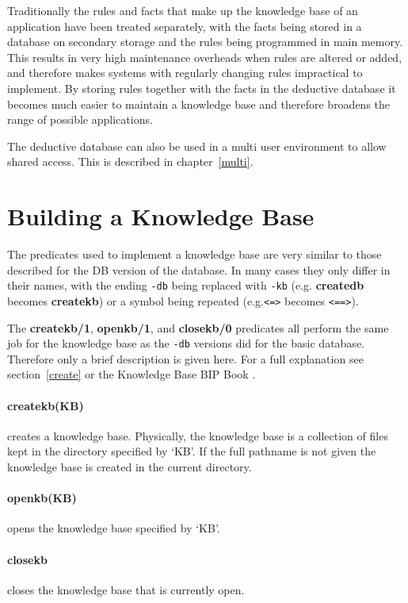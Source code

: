 Traditionally the rules and facts that make up the knowledge base
of an application have been treated separately,
with the facts being stored in a database
on secondary storage and the rules being programmed in main memory.
This results in very high maintenance overheads when
rules are altered or added, and therefore makes systems with
regularly changing rules impractical to implement.
By storing rules together with the facts in the \eclipse deductive database
it becomes much easier to maintain a knowledge base and
therefore broadens the range of possible applications.


The deductive database can also be used in a multi
user environment to allow shared access.  This is described
in chapter~\ref{multi}.

\section{Building a Knowledge Base }


The predicates used to implement a knowledge base are very similar to those 
described for the DB version of the database.  In many cases they only differ
in their names, with
the ending \verb+-db+ being replaced with \verb+-kb+ (e.g. {\bf createdb}
becomes {\bf createkb})
or a symbol being repeated (e.g.\verb+<=>+ becomes \verb+<==>+). 


The {\bf createkb/1}, {\bf openkb/1}, and {\bf closekb/0} predicates all 
perform the same job for the knowledge base as the \verb+-db+ versions
did for the basic database. Therefore only a brief description
is given here. For a full explanation see section~\ref{create} or the
Knowledge Base BIP Book \cite{BIP92}. 

\paragraph{createkb(KB)} creates a knowledge base. 
Physically, the knowledge base is
a collection of files kept in the directory specified by `KB'.  If
the full pathname is not given the knowledge base is created in
the current directory.
\paragraph{openkb(KB)} opens the knowledge base specified by `KB'.
\paragraph{closekb} closes the knowledge base that is currently open. 


